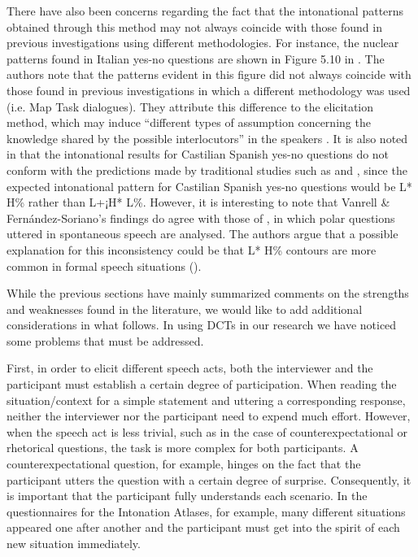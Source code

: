 \documentclass[output=paper]{LSP/langsci}
\begin{document}
There have also been concerns regarding the fact that the intonational patterns obtained through this method may not always coincide with those found in previous investigations using different methodologies. For instance, the nuclear patterns found in Italian yes-no questions are shown in Figure 5.10 in \citet[169]{GiliFivelaETAL2015intonationalvariation}. The authors note that the patterns evident in this figure did not always coincide with those found in previous investigations in which a different methodology was used (i.e. Map Task dialogues). They attribute this difference to the elicitation method, which may induce “different types of assumption concerning the knowledge shared by the possible interlocutors” in the speakers \citep[168]{GiliFivelaETAL2015intonationalvariation}. It is also noted in \citet{Vanrell2014dialectinterrogatives} that the intonational results for Castilian Spanish yes-no questions do not conform with the predictions made by traditional studies such as \citet{NavarroTomas.1944} and \citet{Quilis1981}, since the expected intonational pattern for Castilian Spanish yes-no questions would be L* H\% rather than L+¡H* L\%. However, it is interesting to note that Vanrell \& Fernández-Soriano’s findings do agree with those of \citet{Henriksen2016}, in which polar questions uttered in spontaneous speech are analysed. The authors argue that a possible explanation for this inconsistency could be that L* H\% contours are more common in formal speech situations (\citealt{Henriksen2013,Henriksen2016}).

While the previous sections have mainly summarized comments on the \linebreak strengths and weaknesses found in the literature, we would like to add additional considerations in what follows. In using DCTs in our research we have noticed some problems that must be addressed.

First, in order to elicit different speech acts, both the interviewer and the participant must establish a certain degree of participation. When reading the situation/context for a simple statement and uttering a corresponding response, neither the interviewer nor the participant need to expend much effort. However, when the speech act is less trivial, such as in the case of counterexpectational or rhetorical questions, the task is more complex for both participants. A counterexpectational question, for example, hinges on the fact that the participant utters the question with a certain degree of surprise. Consequently, it is important that the participant fully understands each scenario. In the questionnaires for the Intonation Atlases, for example, many different situations appeared one after another and the participant must get into the spirit of each new situation immediately.
\end{document}
